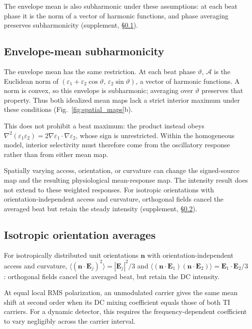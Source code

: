 \documentclass[11pt,a4paper]{article}
\newif\ifjne
\begin{document}
The envelope mean is also subharmonic under these assumptions: at each beat
phase it is the norm of a vector of harmonic functions, and phase averaging
preserves subharmonicity (supplement, \S\ref{supp:envelope-proof}).
\ifjne\else
\subsection{Envelope-mean subharmonicity}\label{supp:envelope-proof}
The envelope mean has the same restriction. At each beat phase $\vartheta$,
$\mathcal A$ is the Euclidean norm of
$(\varepsilon_1+\varepsilon_2\cos\vartheta,\,\varepsilon_2\sin\vartheta)$,
a vector of harmonic functions. A norm is convex, so this envelope is subharmonic;
averaging over $\vartheta$ preserves that property. Thus both idealized mean maps
lack a strict interior maximum under these conditions (Fig.~\ref{fig:spatial_maps}b).

\fi
This does not prohibit a beat maximum: the product instead obeys
$\nabla^2(\varepsilon_1\varepsilon_2)=2\nabla\varepsilon_1\cdot\nabla\varepsilon_2$,
whose sign is unrestricted. Within the homogeneous model, interior selectivity
must therefore come from the oscillatory response rather than from either mean map.

Spatially varying access, orientation, or curvature can change the signed-source
map and the resulting physiological mean-response map. The intensity result does
not extend to these weighted responses. For isotropic orientations with orientation-independent access and curvature,
orthogonal fields cancel the averaged beat but retain the steady intensity
(supplement, \S\ref{supp:orientation}).
\ifjne\else
\subsection{Isotropic orientation averages}\label{supp:orientation}
For isotropically distributed unit orientations
$\mathbf n$ with orientation-independent access and curvature,
$\langle(\mathbf n\cdot\mathbf E_j)^2\rangle=|\mathbf E_j|^2/3$
and $\langle(\mathbf n\cdot\mathbf E_1)(\mathbf n\cdot\mathbf E_2)\rangle
=\mathbf E_1\cdot\mathbf E_2/3$: orthogonal fields cancel the averaged beat,
but retain the DC intensity.

\fi
At equal local RMS polarization, an unmodulated
carrier gives the same mean shift at second order when its DC mixing coefficient
equals those of both TI carriers. For a dynamic detector, this requires the
frequency-dependent coefficient to vary negligibly across the carrier interval.
\end{document}
